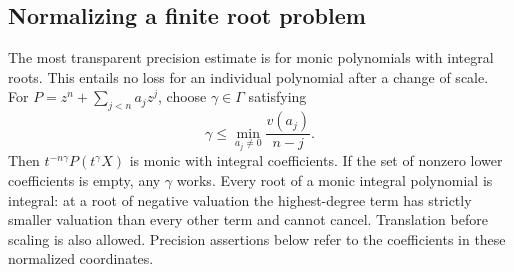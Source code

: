 \documentclass[11pt,letterpaper,oneside]{article}
\numberwithin{equation}{section}
\theoremstyle{definition}
\theoremstyle{remark}\newtheorem{remark}[theorem]{Remark}
\begin{document}
\subsection{Normalizing a finite root problem}
The most transparent precision estimate is for monic polynomials with
integral roots. This entails no loss for an individual polynomial after
a change of scale. For
$P=z^n+\sum_{j<n}a_jz^j$, choose $\gamma\in\Gamma$ satisfying
\[
 \gamma\leq \min_{a_j\ne0}\frac{v(a_j)}{n-j}.
\]
Then $t^{-n\gamma}P(t^\gamma X)$ is monic with integral coefficients.
If the set of nonzero lower coefficients is empty, any $\gamma$ works.
Every root of a monic integral polynomial is integral: at a root of
negative valuation the highest-degree term has strictly smaller valuation
than every other term and cannot cancel. Translation before scaling is
also allowed. Precision assertions below refer to the coefficients in
these normalized coordinates.
\end{document}
